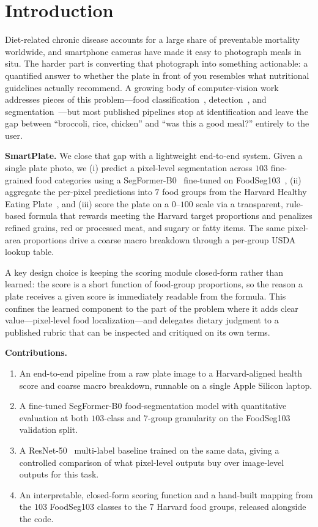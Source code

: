 \section{Introduction}
\label{sec:intro}

Diet-related chronic disease accounts for a large share of preventable mortality worldwide, and smartphone cameras have made it easy to photograph meals in situ.
The harder part is converting that photograph into something actionable: a quantified answer to whether the plate in front of you resembles what nutritional guidelines actually recommend.
A growing body of computer-vision work addresses pieces of this problem---food classification~\cite{bossard2014food101}, detection~\cite{matsuda2012uecfood}, and segmentation~\cite{wu2021foodseg103}---but most published pipelines stop at identification and leave the gap between ``broccoli, rice, chicken'' and ``was this a good meal?'' entirely to the user.

\textbf{SmartPlate.}
We close that gap with a lightweight end-to-end system.
Given a single plate photo, we (i) predict a pixel-level segmentation across $103$ fine-grained food categories using a SegFormer-B0~\cite{xie2021segformer} fine-tuned on FoodSeg103~\cite{wu2021foodseg103}, (ii) aggregate the per-pixel predictions into $7$ food groups from the Harvard Healthy Eating Plate~\cite{harvardplate}, and (iii) score the plate on a $0$--$100$ scale via a transparent, rule-based formula that rewards meeting the Harvard target proportions and penalizes refined grains, red or processed meat, and sugary or fatty items.
The same pixel-area proportions drive a coarse macro breakdown through a per-group USDA~\cite{usdafdc} lookup table.

A key design choice is keeping the scoring module closed-form rather than learned: the score is a short function of food-group proportions, so the reason a plate receives a given score is immediately readable from the formula.
This confines the learned component to the part of the problem where it adds clear value---pixel-level food localization---and delegates dietary judgment to a published rubric that can be inspected and critiqued on its own terms.

\textbf{Contributions.}
\begin{enumerate}
    \item An end-to-end pipeline from a raw plate image to a Harvard-aligned health score and coarse macro breakdown, runnable on a single Apple Silicon laptop.
    \item A fine-tuned SegFormer-B0 food-segmentation model with quantitative evaluation at both $103$-class and $7$-group granularity on the FoodSeg103 validation split.
    \item A ResNet-50~\cite{he2016resnet} multi-label baseline trained on the same data, giving a controlled comparison of what pixel-level outputs buy over image-level outputs for this task.
    \item An interpretable, closed-form scoring function and a hand-built mapping from the $103$ FoodSeg103 classes to the $7$ Harvard food groups, released alongside the code.
\end{enumerate}
